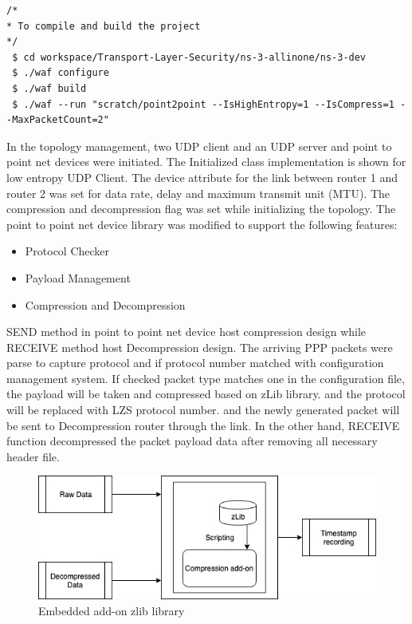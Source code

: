 \documentclass[sigconf]{acmart}
\begin{document}
 \begin{lstlisting}
/*
* To compile and build the project
*/
 $ cd workspace/Transport-Layer-Security/ns-3-allinone/ns-3-dev    
 $ ./waf configure
 $ ./waf build
 $ ./waf --run "scratch/point2point --IsHighEntropy=1 --IsCompress=1 --MaxPacketCount=2"

\end{lstlisting}

In the topology management, two UDP client and an UDP server and point to point net devices were initiated. The Initialized class implementation is shown for low entropy UDP Client. The device attribute for the link between router 1 and router 2 was set for data rate, delay and maximum transmit unit (MTU). The compression and decompression flag was set while initializing the topology. The point to point net device library was modified to support the following features: 
 
\begin{itemize}
\item Protocol Checker
\item Payload Management
\item Compression and Decompression
\end{itemize}
 
 SEND method in point to point net device host compression design while RECEIVE method host Decompression design. The arriving PPP packets were parse to capture protocol and if protocol number matched with configuration management system. If checked packet type matches one in the configuration file, the payload will be taken and compressed based on zLib library. and the protocol will be replaced with LZS protocol number. and the newly generated packet will be sent to Decompression router through the link.  
In the other hand, RECEIVE function decompressed the packet payload data after removing all necessary header file.   
 
 \begin{figure}[h]
  \centering
  \includegraphics[width=\linewidth]{zlib}
  \caption{Embedded add-on zlib library }
  \label{zlib}
\end{figure} 
\end{document}
